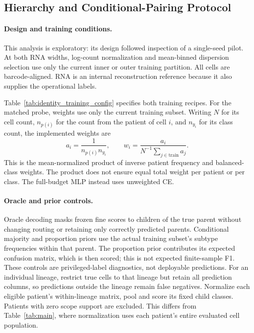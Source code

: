 \subsection{Hierarchy and Conditional-Pairing Protocol}
\label{sec:appendix:identity_questions}
\label{sec:appendix:paired_rna_oracle}

\paragraph{Design and training conditions.}
This analysis is exploratory: its design followed inspection of a single-seed pilot.
At both RNA widths, log-count normalization and mean-binned dispersion
selection use only the current inner or outer training partition.
All \numcells{} cells are barcode-aligned. RNA is an internal reconstruction
reference because it also supplies the operational labels.

Table~\ref{tab:identity_training_config} specifies both training recipes.
For the matched probe, weights use only the current training subset.
Writing $N$ for its cell count, $n_{p(i)}$ for the count from the patient of
cell $i$, and $n_{y_i}$ for its class count, the implemented weights are
\[
 a_i=\frac{1}{n_{p(i)}n_{y_i}},\qquad
 w_i=\frac{a_i}{N^{-1}\sum_{j\in\mathrm{train}}a_j}.
\]
This is the mean-normalized product of inverse patient frequency and
balanced-class weights. The product does not ensure equal total weight
per patient or per class. The full-budget MLP instead uses unweighted CE.


\paragraph{Oracle and prior controls.}
Oracle decoding masks frozen fine scores to children of the true parent
without changing routing or retaining only correctly predicted parents.
Conditional majority and proportion priors use the actual training subset's
subtype frequencies within that parent. The proportion prior contributes
its expected confusion matrix, which is then scored; this is not expected
finite-sample F1. These controls are privileged-label diagnostics, not
deployable predictions. For an individual lineage, restrict true cells to
that lineage but retain all prediction columns, so predictions outside
the lineage remain false negatives. Normalize each eligible patient's
within-lineage matrix, pool and score its fixed child classes. Patients
with zero scope support are excluded. This differs from Table~\ref{tab:main},
where normalization uses each patient's entire evaluated cell population.

